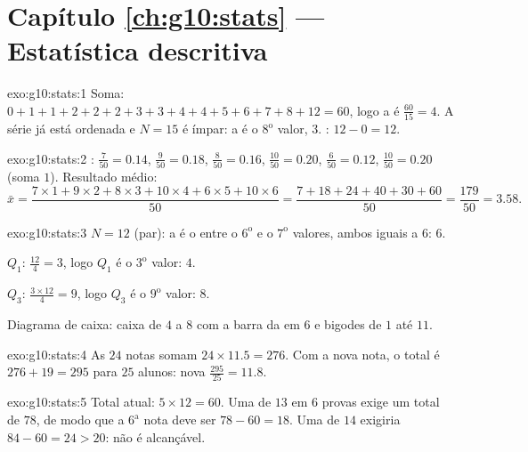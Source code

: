 \section*{Capítulo \ref{ch:g10:stats} --- Estatística descritiva}

\begin{solution}{exo:g10:stats:1}
Soma: $0+1+1+2+2+2+3+3+4+4+5+6+7+8+12 = 60$, logo a  é
$\frac{60}{15} = 4$. A série já está ordenada e $N = 15$ é ímpar: a
 é o $8^{\text{o}}$ valor, $3$. : $12 - 0 = 12$.
\end{solution}

\begin{solution}{exo:g10:stats:2}
: $\frac{7}{50} = 0.14$, $\frac{9}{50} = 0.18$,
$\frac{8}{50} = 0.16$, $\frac{10}{50} = 0.20$, $\frac{6}{50} = 0.12$,
$\frac{10}{50} = 0.20$ (soma $1$). Resultado médio:
\[
\bar x = \frac{7 \times 1 + 9 \times 2 + 8 \times 3 + 10 \times 4
+ 6 \times 5 + 10 \times 6}{50}
= \frac{7 + 18 + 24 + 40 + 30 + 60}{50}
= \frac{179}{50} = 3.58 .
\]
\end{solution}

\begin{solution}{exo:g10:stats:3}
$N = 12$ (par): a  é o  entre o $6^{\text{o}}$ e o
$7^{\text{o}}$ valores, ambos iguais a $6$:  $6$.

$Q_1$: $\frac{12}{4} = 3$, logo $Q_1$ é o $3^{\text{o}}$ valor: $4$.

$Q_3$: $\frac{3 \times 12}{4} = 9$, logo $Q_3$ é o $9^{\text{o}}$ valor:
$8$.

Diagrama de caixa: caixa de $4$ a $8$ com a barra da  em $6$ e
bigodes de $1$ até $11$.
\end{solution}

\begin{solution}{exo:g10:stats:4}
As $24$ notas somam $24 \times 11.5 = 276$. Com a nova nota, o total é
$276 + 19 = 295$ para $25$ alunos: nova  $\frac{295}{25} = 11.8$.
\end{solution}

\begin{solution}{exo:g10:stats:5}
Total atual: $5 \times 12 = 60$. Uma  de $13$ em $6$ provas exige um
total de $78$, de modo que a $6^{\text{a}}$ nota deve ser
$78 - 60 = 18$. Uma  de $14$ exigiria $84 - 60 = 24 > 20$: não é
alcançável.
\end{solution}

